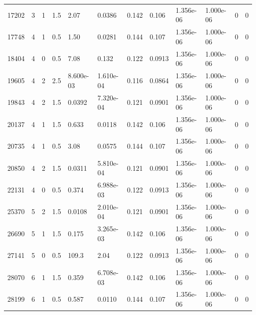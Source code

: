 \documentclass[preview]{standalone}
\begin{document}
{{\begin{tabular}{L{1.2cm}C{1.2cm} C{0.3cm}C{0.5cm} C{1.4cm}C{1.4cm} C{1.4cm}C{1.4cm} C{1.6cm}C{1.6cm} C{1.6cm}C{1.6cm}}
  17202  &     3  & 1     & 1.5 &  2.07  & 0.0386  &  0.142&   0.106& 1.356e-06 & 1.000e-06   &  0 & 0  \\ 
  17748  &     4  & 1     & 0.5 &  1.50  & 0.0281  &  0.144&   0.107& 1.356e-06 & 1.000e-06   &  0 & 0  \\ 
  18404  &     4  & 0     & 0.5 &  7.08  & 0.132  &  0.122&   0.0913& 1.356e-06 & 1.000e-06   &  0 & 0  \\ 
  19605  &     4  & 2     & 2.5 &  8.600e-03  & 1.610e-04  &  0.116&   0.0864& 1.356e-06 & 1.000e-06   &  0 & 0  \\ 
  19843  &     4  & 2     & 1.5 &  0.0392  & 7.320e-04  &  0.121&   0.0901& 1.356e-06 & 1.000e-06   &  0 & 0  \\ 
  20137  &     4  & 1     & 1.5 &  0.633  & 0.0118  &  0.142&   0.106& 1.356e-06 & 1.000e-06   &  0 & 0  \\ 
  20735  &     4  & 1     & 0.5 &  3.08  & 0.0575  &  0.144&   0.107& 1.356e-06 & 1.000e-06   &  0 & 0  \\ 
  20850  &     4  & 2     & 1.5 &  0.0311  & 5.810e-04  &  0.121&   0.0901& 1.356e-06 & 1.000e-06   &  0 & 0  \\ 
  22131  &     4  & 0     & 0.5 &  0.374  & 6.988e-03  &  0.122&   0.0913& 1.356e-06 & 1.000e-06   &  0 & 0  \\ 
  25370  &     5  & 2     & 1.5 &  0.0108  & 2.010e-04  &  0.121&   0.0901& 1.356e-06 & 1.000e-06   &  0 & 0  \\ 
  26690  &     5  & 1     & 1.5 &  0.175  & 3.265e-03  &  0.142&   0.106& 1.356e-06 & 1.000e-06   &  0 & 0  \\ 
  27141  &     5  & 0     & 0.5 &  109.3  & 2.04  &  0.122&   0.0913& 1.356e-06 & 1.000e-06   &  0 & 0  \\ 
  28070  &     6  & 1     & 1.5 &  0.359  & 6.708e-03  &  0.142&   0.106& 1.356e-06 & 1.000e-06   &  0 & 0  \\ 
  28199  &     6  & 1     & 0.5 &  0.587  & 0.0110  &  0.144&   0.107& 1.356e-06 & 1.000e-06   &  0 & 0  \\ 
\hline 
\end{tabular} 

}}
\end{document}
